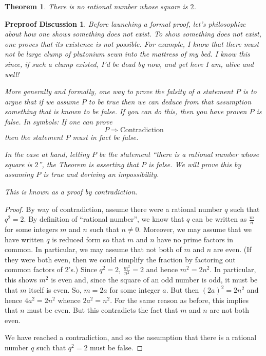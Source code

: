 \documentclass[12pt]{amsart}
\numberwithin{equation}{section}
\theoremstyle{plain} %
\newtheorem{thm}[equation]{Theorem}
\newtheorem{preproof}{Preproof Discussion}
\theoremstyle{definition}
\theoremstyle{remark}
\begin{document}
\begin{thm} There is no rational number whose square is $2$. 
\end{thm}

\begin{preproof} Before launching a formal proof, let's philosophize
  about how one shows something does not exist. To show something does
  not exist, one proves  that its existence is
  not possible. For example, I know that  there must not be large clump of plutonium sewn into the mattress of my bed. I know this since, if such a clump existed, I'd be
  dead by now, and yet here I am, alive and well!

More generally and formally, one way to prove the falsity of a
statement $P$ is to argue that if we assume $P$ to be true then we can deduce from that
assumption something that is known
to be false. If you can do this, then you have proven $P$ is false. In symbols:
If one can prove
$$
P \Longrightarrow \text{Contradiction}
$$
then the statement $P$ must in fact be  false.

In the case at hand, letting  $P$ be the statement ``there is a rational number whose square is $2$'', the Theorem is asserting that $P$ is false. We will prove
this by assuming $P$ is true and deriving an impossibility.

This is known as a proof by contradiction.\end{preproof}

\begin{proof} By way of contradiction, assume there were a rational number $q$ such that $q^2 = 2$. By definition of ``rational number'',  
we know that $q$ can be written as  $\frac{m}{n}$ for
some integers $m$ and $n$ such that $n \ne 0$. Moreover, we may assume that we have written $q$ is reduced form so that $m$ and $n$ have no
prime factors in common. In particular, we may assume that not both of $m$ and $n$ are even. (If they
  were both even, then  we could simplify the fraction by factoring out common factors of $2$'s.) Since $q^2 = 2$,
  $\frac{m^2}{n^2} = 2$ and hence $m^2 = 2n^2$. In particular, this shows $m^2$ is even and, since the square of an odd number is odd, it must be that $m$
  itself is even. So, $m = 2 a$ for some integer $a$. But then $(2a)^2 = 2n^2$ and hence $4a^2 = 2n^2$ whence $2a^2 = n^2$. For the same reason as before, this
  implies that $n$
  must be even. But this contradicts the fact that $m$ and $n$ are not both even. 

We have reached a contradiction, and so the assumption that there is a rational number $q$ such that $q^2 = 2$ must be false.
\end{proof}
\end{document}
